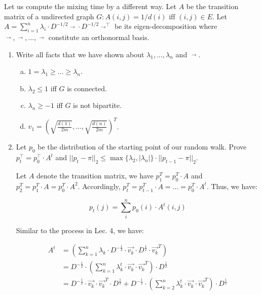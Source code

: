 \begin{problem}[40 points] Let us compute the mixing time by a different way. Let $A$ be the transition matrix of a undirected graph $G: A(i, j) = 1/d(i) \text{\ iff\ }(i, j) \in E$. Let $A = \sum_{i=1}^{n}\lambda_i\cdot D^{-1/2}\mathop{v_{i}}\limits ^{\rightarrow}\cdot D^{-1/2}{\mathop{v_{i}}\limits ^{\rightarrow}}^\top$ be its eigen-decomposition where $\mathop{v_{1}}\limits ^{\rightarrow},\mathop{v_{2}}\limits ^{\rightarrow},...,\mathop{v_{n}}\limits ^{\rightarrow}$ constitute an orthonormal basis.
\end{problem}
\begin{enumerate}
	\item Write all facts that we have shown about $\lambda_1,...,\lambda_n$ and $\mathop{u_{1}}\limits^{\rightarrow}$.
	
  \Answer

  \begin{enumerate}[(a)]
      \item $1=\lambda_1 \geq \ldots \geq\lambda_n$.
      \item $\lambda_2 \le 1$ iff $G$ is connected.
      \item $\lambda_n \ge -1$ iff $G$ is not bipartite.
      \item $v_1=\left(\sqrt{\frac{d(1)}{2m}},\ldots, \sqrt{\frac{d(n)}{2m}}\right)^T$.
  \end{enumerate}

  \item Let $p_0$ be the distribution of the starting point of our random walk. Prove $p_t^\top=p_0^\top\cdot A^t$ and $||p_t - \pi||_2 \le \max\{\lambda_2,|\lambda_n|\}\cdot||p_{t-1}-\pi||_2$.
    
  \Answer
  Let $A$ denote the transition matrix, we have $p_1^T=p_0^T \cdot A$ and $p_2^T=p_1^T \cdot A=p_0^T \cdot A^2$. Accordingly, $p_t^T=p_{t-1}^T \cdot A= \ldots =p_0^T \cdot A^t$. Thus, we have:

  \begin{equation}
      p_t(j)=\sum_i^n p_0(i) \cdot A^t(i,j)
  \end{equation}

  Similar to the process in Lec. 4, we have:

  \begin{equation}
      \begin{aligned}
          A^t &= \left(\sum_{k=1}^n \lambda_k \cdot D^{-\frac{1}{2}} \cdot \vec{v_k} \cdot D^{\frac{1}{2}} \cdot \vec{v_k}^T  \right)\\
          &= D^{-\frac{1}{2}} \cdot \left(\sum_{k=1}^n \lambda_k^t \cdot \vec{v_k} \cdot \vec{v_k}^T\right) \cdot D^{\frac{1}{2}}\\
          &= D^{-\frac{1}{2}} \cdot \vec{v_k} \cdot \vec{v_k}^T \cdot D^{\frac{1}{2}} + D^{-\frac{1}{2}} \cdot \left(\sum_{k=2}^n \lambda_k^t \cdot \vec{v_k} \cdot \vec{v_k}^T\right) \cdot D^{\frac{1}{2}}
      \end{aligned}
  \end{equation}


\end{enumerate}
